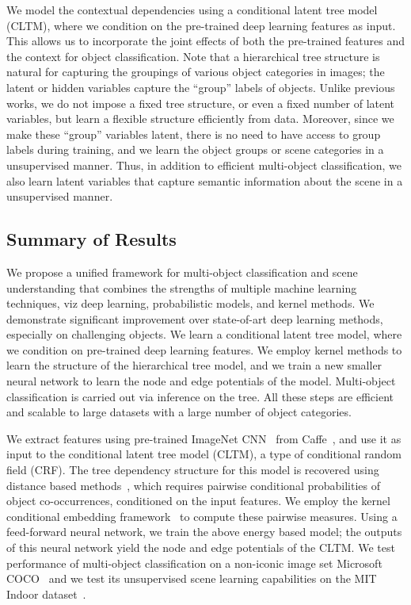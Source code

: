 \documentclass{article}
\begin{document}
We model the contextual   dependencies using a conditional latent  tree model (CLTM), where we condition on the pre-trained deep learning features as input. This allows us to incorporate the joint effects of both the pre-trained features and the context for object classification.
Note that a hierarchical tree structure is natural for capturing the groupings of various object categories in images; the latent or hidden variables capture the ``group'' labels   of objects. Unlike previous works, we do not impose a fixed tree structure, or even a fixed number of latent variables, but learn a flexible structure efficiently from data. Moreover, since we make these ``group'' variables latent, there is no need to have access to  group labels during  training, and we  learn the object groups or scene categories in a unsupervised manner. Thus, in addition to efficient multi-object classification, we also learn latent variables that capture semantic information about the scene in a unsupervised manner.

\subsection{Summary of Results}

We propose a unified framework for multi-object classification and scene understanding that combines the strengths of multiple machine learning techniques, viz deep learning, probabilistic models, and kernel methods. We demonstrate significant improvement over state-of-art deep learning methods, especially on challenging objects. We learn a conditional latent tree model, where we condition on pre-trained deep learning features. We employ kernel methods to learn the structure of the hierarchical tree model, and we train a new smaller neural network to learn the node and edge potentials of the model. Multi-object classification is carried out via  inference on the tree. All these steps are efficient and scalable to large datasets with a large number of object categories.



We extract features using pre-trained ImageNet CNN~\cite{imagenet} from Caffe~\cite{caffe}, and use it as input to the conditional latent tree model (CLTM), a type of conditional random field (CRF).   The tree dependency structure for this model is recovered using distance based methods~\cite{LTM}, which requires pairwise conditional probabilities of object co-occurrences, conditioned on the input features. We employ the kernel conditional embedding framework~\cite{song} to compute these pairwise measures. Using a feed-forward neural network, we   train the above energy based model; the outputs of this neural network yield the node and edge potentials of the CLTM. We test performance of multi-object classification on a non-iconic image set Microsoft COCO~\cite{MSCOCO} and we test its unsupervised scene learning capabilities on the MIT Indoor dataset~\cite{objectbank}.%
\end{document}
